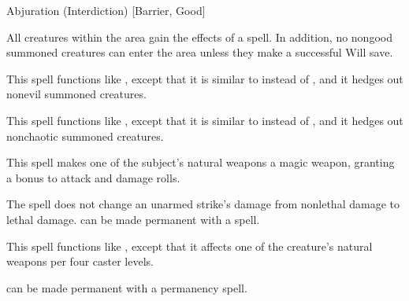 \par Abjuration (Interdiction) [Barrier, Good]
\begin{spelleffect}
  All creatures within the area gain the effects of a  spell. In addition, no nongood summoned creatures can enter the area unless they make a successful Will save.
\end{spelleffect}

\begin{spelleffect}
  This spell functions like , except that it is similar to  instead of , and it hedges out nonevil summoned creatures.
\end{spelleffect}

\begin{spelleffect}
  This spell functions like , except that it is similar to  instead of , and it hedges out nonchaotic summoned creatures.
\end{spelleffect}

\spellrng{\rngclose}
\spelldur{\durshort}
\begin{spelleffect}
  This spell makes one of the subject's natural weapons a  magic weapon, granting a  bonus to attack and damage rolls. \bonusscalingdescription
\end{spelleffect}
\begin{spellnotes}
  The spell does not change an unarmed strike's damage from nonlethal damage to lethal damage.  can be made permanent with a  spell.
\end{spellnotes}

\begin{spelleffect}
  This spell functions like , except that it affects one of the creature's natural weapons per four caster levels.
\end{spelleffect}
\begin{spellnotes}
   can be made permanent with a permanency spell.
\end{spellnotes}

